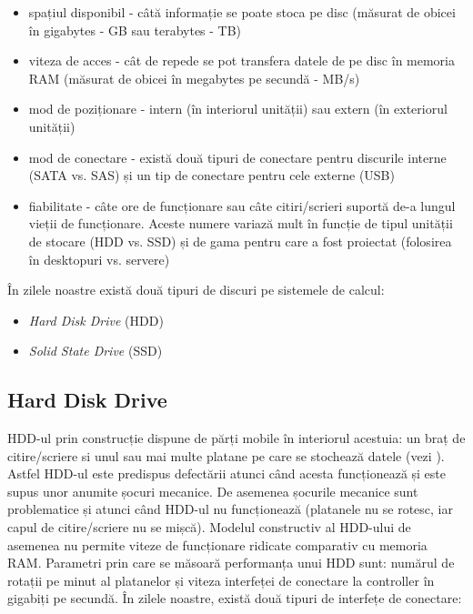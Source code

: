\begin{itemize}
	\item spațiul disponibil - câtă informație se poate stoca pe disc
		(măsurat de obicei în gigabytes - GB sau terabytes
		 - TB)
	\item viteza de acces - cât de repede se pot transfera datele de pe disc
		în memoria RAM (măsurat de obicei în megabytes pe secundă - MB/s)
	\item mod de poziționare - intern (în interiorul unității) sau extern
		(în exteriorul unității)
	\item mod de conectare - există două tipuri de conectare pentru
		discurile interne (SATA vs. SAS) și un tip de conectare pentru cele externe (USB)
	\item fiabilitate - câte ore de funcționare sau câte citiri/scrieri
		suportă de-a lungul vieții de funcționare. Aceste numere variază
		mult în funcție de tipul unității de stocare (HDD vs. SSD) și de
		gama pentru care a fost proiectat (folosirea în desktopuri vs.
		servere)
\end{itemize}

În zilele noastre există două tipuri de discuri pe sistemele de calcul:

\begin{itemize}
  \item \textit{Hard Disk Drive} (HDD)
  \item \textit{Solid State Drive} (SSD)
\end{itemize}

\subsection{Hard Disk Drive}
\label{sec:storage:type:hdd}

HDD-ul prin construcție dispune de părți mobile în interiorul acestuia: un braț
de citire/scriere si unul sau mai multe platane pe care se stochează datele
(vezi ). Astfel HDD-ul este predispus defectării atunci când acesta
funcționează și este supus unor anumite șocuri mecanice. De asemenea șocurile
mecanice sunt problematice și atunci când HDD-ul nu funcționează (platanele nu
se rotesc, iar capul de citire/scriere nu se mișcă). Modelul constructiv al
HDD-ului de asemenea nu permite viteze de funcționare ridicate comparativ cu
memoria RAM. Parametri prin care se măsoară performanța unui HDD sunt: numărul
de rotații pe minut al platanelor și viteza interfeței de conectare la
controller în gigabiți pe secundă. În zilele noastre, există două tipuri de
interfețe de conectare:

